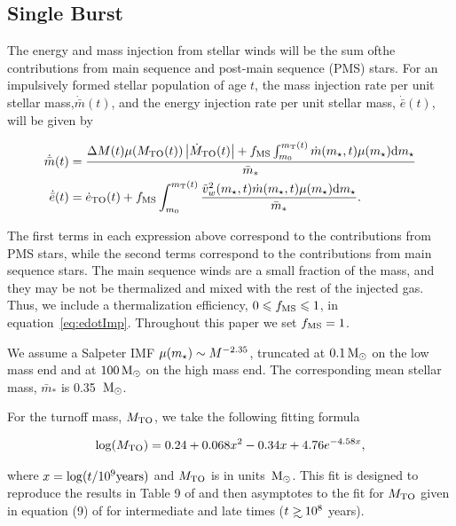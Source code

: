 \subsection{Single Burst}

The energy and mass injection from stellar winds will be the sum ofthe
contributions from main sequence and post-main sequence (PMS) stars.
For an impulsively formed stellar population of age $t$, the mass
injection rate per unit stellar mass,$\dot{\bar{m}}(t)$, and  the energy
injection rate per unit stellar mass, $\dot{\bar{e}}(t)$,  will be given by

\begin{align} 
  \dot{\bar{m}}(t) &= \frac{\Delta M(t) \mu(M_{\rm TO}(t))
    \left|\dot{M}_{\rm TO}(t)\right| + f_{\rm MS} \int_{m_0}^{m_{\rm
        T}(t)}
    \dot{m}(\Mstar, t) \mu(\Mstar) {\rm d}\Mstar }{\bar{m}_*}\\
  \dot{\bar{e}}(t) &=\dot{e}_{\rm TO}(t)+ f_{\rm MS} \int_{m_0}^{m_{\rm T}(t)}
  \frac{\vw^2(\Mstar, t) \dot{m}(\Mstar, t) \mu(\Mstar) {\rm d}\Mstar}{\bar{m}_*}.
  \label{eq:edotImp}
\end{align} 

The first terms in each expression above correspond to the
contributions from PMS stars, while the second terms correspond to the
contributions from main sequence stars. The main sequence winds are a
small fraction of the mass, and they may be not be thermalized and
mixed with the rest of the injected gas. Thus, we include a
thermalization efficiency, $ 0\le f_{\rm MS}\le 1$, in
equation~\eqref{eq:edotImp}. Throughout this paper we set $f_{\rm
  MS}=1$. 

We assume a Salpeter IMF $\mu(\Mstar)\sim M^{-2.35}$, truncated at $0.1
\Msun$ on the low mass end and at $100 \Msun$ on the high mass
end. The corresponding mean stellar mass, $\bar{m}_*$ is 0.35 $\Msun$.

For the turnoff mass, $M_{\rm TO}$, we take the following fitting
formula 

\begin{align}
\log(M_{\rm TO})=0.24 + 0.068 x^2-0.34 x+4.76 e^{-4.58 x},
\end{align}

where $x=\log(t/10^9 {\rm years})$ and $M_{\rm TO}$ is in units
$\Msun$. This fit is designed to reproduce the results in 
Table 9 of \citet{MaederMeynet:1987a} and then asymptotes to the fit
for $M_{\rm TO}$ given in equation (9) of \citet{CiottiOstriker:2007a}
for intermediate and late times ($t \gsim 10^8$ years).


